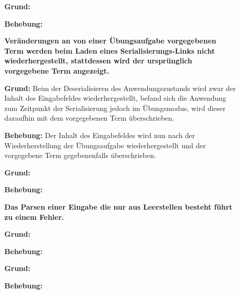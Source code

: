 \documentclass[parskip=full,11pt,openany]{scrreprt}
\begin{document}
\begin{itemize}[itemsep=3ex]
\item[] %
\begin{itemize}[noitemsep]
\item[] {\bfseries  }
\item [\textbf{Grund:}]
\item [\textbf{Behebung:}]
\end{itemize}


\item[] %
\begin{itemize}[noitemsep]
\item[] {\bfseries Veränderungen an von einer Übungsaufgabe vorgegebenen Term  werden beim Laden eines Serialisierungs-Links nicht wiederhergestellt, stattdessen wird der ursprünglich vorgegebene Term angezeigt. }
\item [\textbf{Grund:}] Beim der Deserialisieren des Anwendungszustands wird zwar der Inhalt des Eingabefeldes wiederhergestellt, befand sich die Anwendung zum Zeitpunkt der Serialisierung jedoch im Übungsmodus, wird dieser daraufhin mit dem vorgegebenen Term überschrieben. 
\item [\textbf{Behebung:}] Der Inhalt des Eingabefeldes wird nun nach der Wiederherstellung der Übungsaufgabe wiederhergestellt und der vorgegebene Term gegebenenfalls überschrieben.
\end{itemize}

\item[] %
\begin{itemize}[noitemsep]
\item[] {\bfseries }
\item [\textbf{Grund:}]
\item [\textbf{Behebung:}]
\end{itemize}

\item[] %
\begin{itemize}[noitemsep]
\item[] {\bfseries Das Parsen einer Eingabe die nur aus Leerstellen besteht führt zu einem Fehler.}
\item [\textbf{Grund:}]
\item [\textbf{Behebung:}]
\end{itemize}

\item[] %
\begin{itemize}[noitemsep]
\item[] {\bfseries }
\item [\textbf{Grund:}]
\item [\textbf{Behebung:}]
\end{itemize}


\end{itemize}
\end{document}
